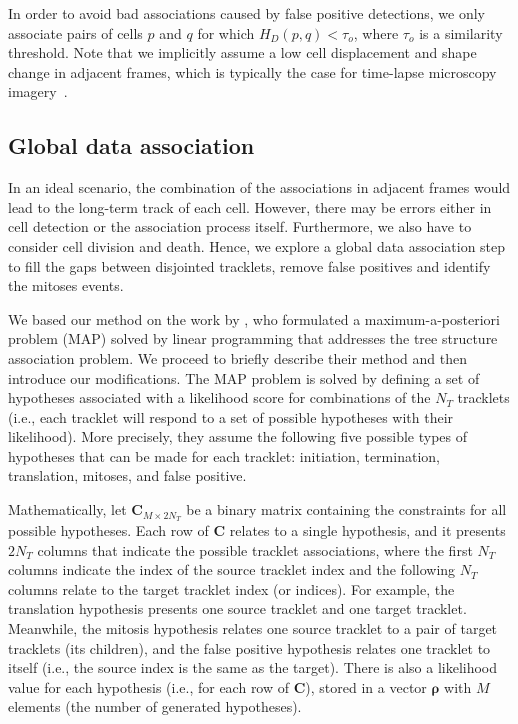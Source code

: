 \documentclass{article}
\begin{document}
In order to avoid bad associations caused by false positive detections, we only associate pairs of cells $p$ and $q$ for which $H_D(p,q)<\tau_o$, where $\tau_o$ is a similarity threshold. Note that we implicitly assume a low cell displacement and shape change in adjacent frames, which is typically the case for time-lapse microscopy imagery~\cite{bise}. 

\subsection{Global data association}

In an ideal scenario, the combination of the associations in adjacent frames would lead to the long-term track of each cell. However, there may be errors either in cell detection or the association process itself. Furthermore, we also have to consider cell division and death. Hence, we explore a global data association step to fill the gaps between disjointed tracklets, remove false positives and identify the mitoses events. 

We based our method on the work by \cite{bise}, who formulated a maximum-a-posteriori problem (MAP) solved by linear programming that addresses the tree structure association problem. We proceed to briefly describe their method and then introduce our modifications. The MAP problem is solved by defining a set of hypotheses associated with a likelihood score for combinations of the $N_T$ tracklets (i.e., each tracklet will respond to a set of possible hypotheses with their likelihood). More precisely, they assume the following five possible types of hypotheses that can be made for each tracklet: initiation, termination, translation, mitoses, and false positive. 

Mathematically, let  $\bm{C}_{M\times 2N_T}$ be a binary matrix containing the constraints for all possible hypotheses. Each row of $\bm{C}$ relates to a single hypothesis, and it presents $2N_T$ columns that indicate the possible tracklet associations, where the first $N_T$ columns indicate the index of the source tracklet index and the following $N_T$ columns relate to the target tracklet index (or indices). For example, the translation hypothesis presents one source tracklet and one target tracklet. Meanwhile, the mitosis hypothesis relates one source tracklet to a pair of target tracklets (its children), and the false positive hypothesis relates one tracklet to itself (i.e., the source index is the same as the target). There is also a likelihood value for each hypothesis (i.e., for each row of $\bm{C}$), stored in a vector $\bm{\rho}$ with $M$ elements (the number of generated hypotheses).
\end{document}
